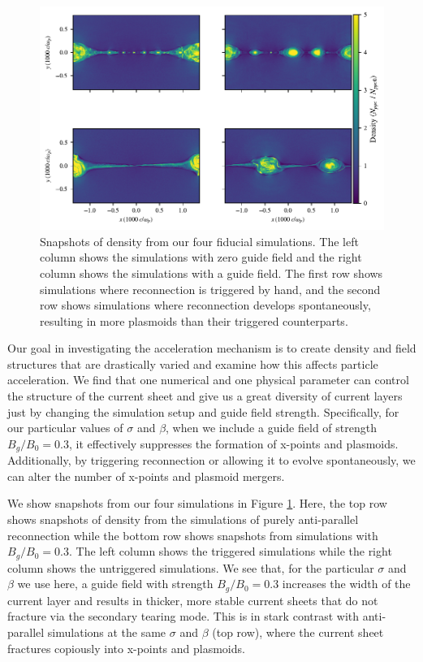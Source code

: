 \documentclass[iop,twocolappendix]{emulateapj}
\begin{document}
\begin{figure}[!h]
	\includegraphics[width=\linewidth]{2x2_flds.pdf}
	\caption{Snapshots of density from our four fiducial simulations.  The left column shows the simulations with zero guide field and the right column shows the simulations with a guide field.  The first row shows simulations where reconnection is triggered by hand, and the second row shows simulations where reconnection develops spontaneously, resulting in more plasmoids than their triggered counterparts.
	}
	\label{lowbeta_fourdens}
\end{figure}


Our goal in investigating the acceleration mechanism is to create density and field structures that are drastically varied and examine how this affects particle acceleration.  We find that one numerical and one physical parameter can control the structure of the current sheet and give us a great diversity of current layers just by changing the simulation setup and guide field strength.  Specifically, for our particular values of $\sigma$ and $\beta$, when we include a guide field of strength $B_{g}/B_{0}=0.3$, it effectively suppresses the formation of x-points and plasmoids.  Additionally, by triggering reconnection or allowing it to evolve spontaneously, we can alter the number of x-points and plasmoid mergers.

We show snapshots from our four simulations in Figure \ref{lowbeta_fourdens}.  Here, the top row shows snapshots of density from the simulations of purely anti-parallel reconnection while the bottom row shows snapshots from simulations with $B_{g}/B_{0}=0.3$.  The left column shows the triggered simulations while the right column shows the untriggered simulations.  We see that, for the particular $\sigma$ and $\beta$ we use here, a guide field with strength $B_{g}/B_{0}=0.3$ increases the width of the current layer and results in thicker, more stable current sheets that do not fracture via the secondary tearing mode.  This is in stark contrast with anti-parallel simulations at the same $\sigma$ and $\beta$ (top row), where the current sheet fractures copiously into x-points and plasmoids.
 
\end{document}
